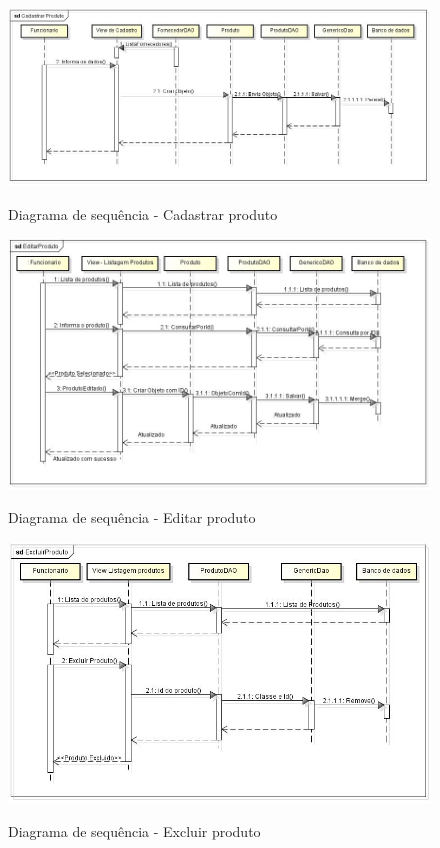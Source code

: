 \begin{anexosenv}
\begin{figure}[h]
\centering
\caption{Diagrama de sequência - Cadastrar produto}
\includegraphics[width=15cm]{imagens/diagramas/sequCadastrar}
\label{fig:Diagrama de sequência - Excluir}
\end{figure}

\begin{figure}[H]
\centering
\caption{Diagrama de sequência - Editar produto}
\includegraphics[width=14cm]{imagens/diagramas/sequEditar}
\label{fig:Diagrama de sequência - Excluir}
\end{figure}

\begin{figure}[H]
\centering
\caption{Diagrama de sequência - Excluir produto}
\includegraphics[width=14cm]{imagens/diagramas/sequExcluir}
\label{fig:Diagrama de sequência - Excluir}
\end{figure}



\end{anexosenv}
